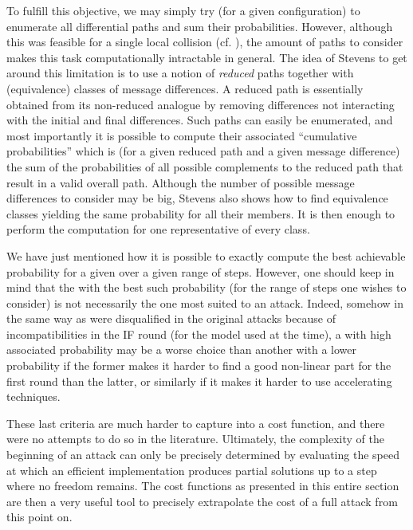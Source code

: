 To fulfill this objective, we may simply try (for a given configuration) to enumerate all differential paths and sum their probabilities. However, although this was feasible for a single local collision
(cf. \cite{DBLP:conf/fse/MendelPRR06a}),
the amount of paths to consider makes this task computationally intractable in general. The idea of Stevens to get around this limitation is to use a notion of \emph{reduced} paths together with
(equivalence) classes of message differences. A reduced path is essentially obtained from its non-reduced analogue by removing differences not interacting with the initial and final differences. Such
paths can easily be enumerated, and most importantly it is possible to compute their associated ``cumulative probabilities'' which is (for a given reduced path and a given message difference) the sum of
the probabilities of all possible complements to the reduced path that result in a valid overall path. Although the number of possible message differences to consider may be big, Stevens also shows how
to find equivalence classes yielding the same probability for all their members. It is then enough to perform the computation for one representative of every class. 


\medskip

We have just mentioned how it is possible to exactly compute the best achievable probability for a given \dv over a given range of steps. However, one should keep in mind that the \dv with the best such
probability (for the range of steps one wishes to consider) is not necessarily the one most suited to an attack. Indeed, somehow in the same way as \dvs were disqualified in the original \shazero
attacks because of incompatibilities in the IF round (for the model used at the time), a \dv with high associated probability may be a worse choice than another with a lower probability if the former
makes it harder to find a good non-linear part for the first round than the latter, or similarly if it makes it harder to use accelerating techniques.

These last criteria are much harder to capture into a cost function, and there were no attempts to do so in the literature. Ultimately, the complexity of the beginning of an attack can only
be precisely determined by evaluating the speed at which an efficient implementation produces partial solutions up to a step where no freedom remains.
The cost functions as presented in this entire section are then a very useful tool to precisely extrapolate the cost of a full attack from this point on.
